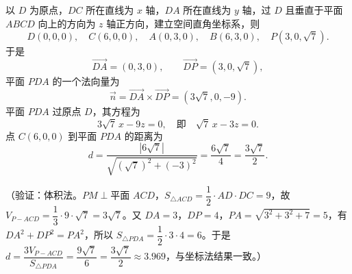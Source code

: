 \begin{answer}
以 \(D\) 为原点，\(DC\) 所在直线为 \(x\) 轴，\(DA\) 所在直线为 \(y\) 轴，过 \(D\) 且垂直于平面 \(ABCD\) 向上的方向为 \(z\) 轴正方向，建立空间直角坐标系，则
\nopagebreak[4]
\[
D(0,0,0),\quad C(6,0,0),\quad A(0,3,0),\quad B(6,3,0),\quad P(3,0,\sqrt7).
\]
于是
\nopagebreak[4]
\[
\overrightarrow{DA}=(0,3,0),\qquad \overrightarrow{DP}=(3,0,\sqrt7),
\]
平面 \(PDA\) 的一个法向量为
\nopagebreak[4]
\[
\vec n=\overrightarrow{DA}\times\overrightarrow{DP}=(3\sqrt7,0,-9).
\]
平面 \(PDA\) 过原点 \(D\)，其方程为
\nopagebreak[4]
\[
3\sqrt7\,x-9z=0,\quad\text{即}\quad \sqrt7\,x-3z=0.
\]
点 \(C(6,0,0)\) 到平面 \(PDA\) 的距离为
\nopagebreak[4]
\[
d=\dfrac{|6\sqrt7|}{\sqrt{(\sqrt7)^2+(-3)^2}}=\dfrac{6\sqrt7}{4}=\dfrac{3\sqrt7}{2}.
\]

（验证：体积法。\(PM\perp\text{平面 }ACD\)，\(S_{\triangle ACD}=\dfrac12\cdot AD\cdot DC=9\)，故 \(V_{P-ACD}=\dfrac13\cdot9\cdot\sqrt7=3\sqrt7\)。又 \(DA=3\)，\(DP=4\)，\(PA=\sqrt{3^2+3^2+7}=5\)，有 \(DA^2+DP^2=PA^2\)，所以 \(S_{\triangle PDA}=\dfrac12\cdot3\cdot4=6\)。于是 \(d=\dfrac{3V_{P-ACD}}{S_{\triangle PDA}}=\dfrac{9\sqrt7}{6}=\dfrac{3\sqrt7}{2}\approx3.969\)，与坐标法结果一致。）




\end{answer}
